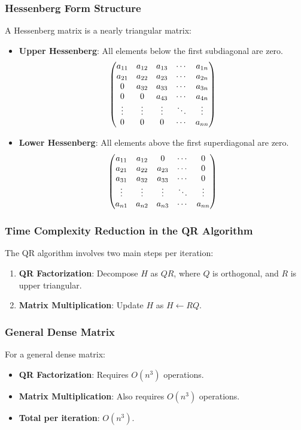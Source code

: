 \documentclass[12pt]{article}
\numberwithin{equation}{subsubsection}
\begin{document}
\subsubsection{Hessenberg Form Structure}
A Hessenberg matrix is a nearly triangular matrix:
\begin{itemize}
	\item \textbf{Upper Hessenberg}: All elements below the first subdiagonal are zero.
	      \begin{align}
	      \begin{pmatrix}a_{11} & a_{12} & a_{13} & \cdots & a_{1n} \\
	      	a_{21} & a_{22} & a_{23} & \cdots & a_{2n} \\
	      	0      & a_{32} & a_{33} & \cdots & a_{3n} \\
	      	0      & 0      & a_{43} & \cdots & a_{4n} \\
	      	\vdots & \vdots & \vdots & \ddots & \vdots \\
	      	0      & 0      & 0      & \cdots & a_{nn}
	      \end{pmatrix}
	      \end{align}
	\item \textbf{Lower Hessenberg}: All elements above the first superdiagonal are zero.
	      \begin{align}
	      \begin{pmatrix}a_{11} & a_{12} & 0      & \cdots & 0      \\
	      	a_{21} & a_{22} & a_{23} & \cdots & 0      \\
	      	a_{31} & a_{32} & a_{33} & \cdots & 0      \\
	      	\vdots & \vdots & \vdots & \ddots & \vdots \\
	      	a_{n1} & a_{n2} & a_{n3} & \cdots & a_{nn}\end{pmatrix}
	      	\end{align}
\end{itemize}

\subsubsection{Time Complexity Reduction in the QR Algorithm}
The QR algorithm involves two main steps per iteration:
\begin{enumerate}
	\item \textbf{QR Factorization}: Decompose $ H $ as $ Q R $, where $ Q $ is orthogonal, and $ R $ is upper triangular.
	\item \textbf{Matrix Multiplication}: Update $ H $ as $ H \leftarrow RQ $.
\end{enumerate}

\subsubsection*{General Dense Matrix}
For a general dense matrix:
\begin{itemize}
	\item \textbf{QR Factorization}: Requires $ O(n^3) $ operations.
	\item \textbf{Matrix Multiplication}: Also requires $ O(n^3) $ operations.
	\item \textbf{Total per iteration}: $ O(n^3) $.
\end{itemize}
\end{document}
